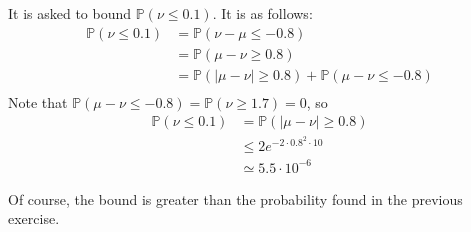 \documentclass{article}
\newcommand{\prob}{\mathbb{P}}
\begin{document}
    It is asked to bound $\prob(\nu \le 0.1)$.
    It is as follows:
    \begin{align*}
        \prob(\nu \le 0.1) &= \prob(\nu - \mu \le -0.8) \\
        &= \prob(\mu - \nu \ge 0.8) \\
        &= \prob(|\mu - \nu| \ge 0.8) + \prob(\mu - \nu \le - 0.8) \\
    \end{align*}
    Note that $\prob(\mu - \nu \le - 0.8) = \prob(\nu \ge 1.7) = 0$, so
    \begin{align*}
        \prob(\nu \le 0.1) &= \prob(|\mu - \nu| \ge 0.8) \\
        &\le 2e^{-2 \cdot 0.8^2 \cdot 10} \\
        &\simeq 5.5 \cdot 10^{-6}
    \end{align*}

    Of course, the bound is greater than the probability found in the previous exercise.

    
    
\end{document}
